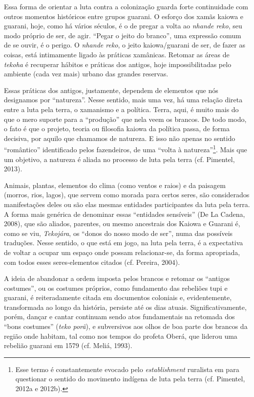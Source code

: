 Essa forma de orientar a luta contra a colonização guarda forte
continuidade com outros momentos históricos entre grupos guarani. O
esforço dos xamãs kaiowa e guarani, hoje, como há vários séculos, é o
de pregar a volta ao \emph{nhande reko}, seu modo próprio de ser, de agir.
``Pegar o jeito do branco'', uma expressão comum de se ouvir, é o perigo.
O \emph{nhande reko}, o jeito kaiowa/guarani de ser, de fazer as coisas, está
intimamente ligado às práticas xamânicas. Retomar as áreas de \emph{tekoha} é
recuperar hábitos e práticas dos antigos, hoje impossibilitadas pelo
ambiente (cada vez mais) urbano das grandes reservas.

Essas práticas dos antigos, justamente, dependem de elementos que nós
designamos por ``natureza''. Nesse sentido, mais uma vez, há uma relação
direta entre a luta pela terra, o xamanismo e a política. Terra, aqui,
é muito mais do que o mero suporte para a ``produção'' que nela veem os
brancos. De todo modo, o fato é que o projeto, teoria ou filosofia
kaiowa da política passa, de forma decisiva, por aquilo que chamamos de
natureza. E isso não apenas no sentido ``romântico'' identificado pelos
fazendeiros, de uma ``volta à natureza''\footnote{Esse termo é
constantemente evocado pelo \emph{establishment} ruralista em  para
questionar o sentido do movimento indígena de luta pela terra (cf.
Pimentel, 2012a e 2012b).}. Mais que um objetivo, a natureza é aliada
no processo de luta pela terra (cf. Pimentel, 2013).

Animais, plantas, elementos do clima (como ventos e raios) e da paisagem
(morros, rios, lagos), que servem como morada para certos seres, são
considerados manifestações deles ou são elas mesmas entidades
participantes da luta pela terra. A forma mais genérica de denominar
essas ``entidades sensíveis'' (De La Cadena, 2008), que são aliados,
parentes, ou mesmo ancestrais dos Kaiowa e Guarani é, como se viu,
\emph{Tekojára}, os ``donos do nosso modo de ser'', numa das possíveis
traduções. Nesse sentido, o que está em jogo, na luta pela terra, é a
expectativa de voltar a ocupar um espaço onde possam relacionar-se, da
forma apropriada, com todos esses seres-elementos citados (cf. Pereira,
2004).

A ideia de abandonar a ordem imposta pelos brancos e retomar os ``antigos
costumes'', ou os costumes próprios, como fundamento das rebeliões tupi
e guarani, é reiteradamente citada em documentos coloniais e,
evidentemente, transformada ao longo da história, persiste até os dias
atuais. Significativamente, porém, dançar e cantar continuam sendo atos
fundamentais na retomada dos ``bons costumes'' (\emph{teko porã}), e subversivos
aos olhos de boa parte dos brancos da região onde habitam, tal como nos
tempos do profeta Oberá, que liderou uma rebelião guarani em 1579 (cf.
Meliá, 1993).

